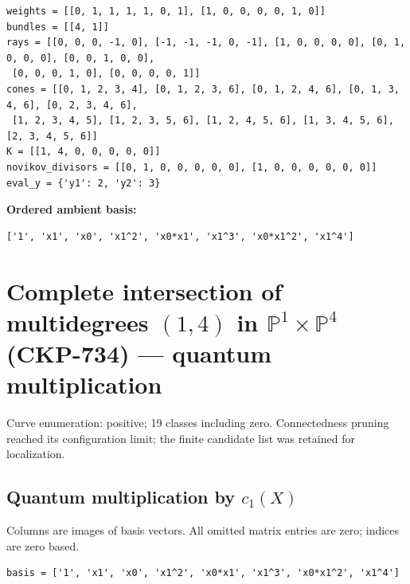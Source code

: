 \documentclass[10pt,a4paper]{article}
\begin{document}
\begin{lstlisting}
weights = [[0, 1, 1, 1, 1, 0, 1], [1, 0, 0, 0, 0, 1, 0]]
bundles = [[4, 1]]
rays = [[0, 0, 0, -1, 0], [-1, -1, -1, 0, -1], [1, 0, 0, 0, 0], [0, 1, 0, 0, 0], [0, 0, 1, 0, 0],
 [0, 0, 0, 1, 0], [0, 0, 0, 0, 1]]
cones = [[0, 1, 2, 3, 4], [0, 1, 2, 3, 6], [0, 1, 2, 4, 6], [0, 1, 3, 4, 6], [0, 2, 3, 4, 6],
 [1, 2, 3, 4, 5], [1, 2, 3, 5, 6], [1, 2, 4, 5, 6], [1, 3, 4, 5, 6], [2, 3, 4, 5, 6]]
K = [[1, 4, 0, 0, 0, 0, 0]]
novikov_divisors = [[0, 1, 0, 0, 0, 0, 0], [1, 0, 0, 0, 0, 0, 0]]
eval_y = {'y1': 2, 'y2': 3}
\end{lstlisting}

\textbf{Ordered ambient basis:}
\begin{lstlisting}
['1', 'x1', 'x0', 'x1^2', 'x0*x1', 'x1^3', 'x0*x1^2', 'x1^4']
\end{lstlisting}

\clearpage\section*{Complete intersection of multidegrees $(1,4)$ in $\mathbb P^{1}\times \mathbb P^{4}$ (CKP-734) --- quantum multiplication}

Curve enumeration: positive; 19 classes including zero.
Connectedness pruning reached its configuration limit; the finite candidate list was retained for localization.
\subsection*{Quantum multiplication by $c_1(X)$}
Columns are images of basis vectors. All omitted matrix entries are zero; indices are zero based.

\begin{lstlisting}
basis = ['1', 'x1', 'x0', 'x1^2', 'x0*x1', 'x1^3', 'x0*x1^2', 'x1^4']
\end{lstlisting}
\end{document}
